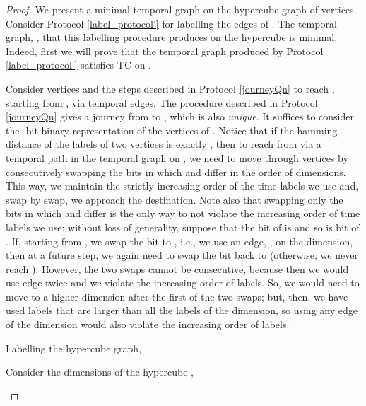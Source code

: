 \documentclass[a4paper,UKenglish]{article}
\begin{document}
\begin{proof}
We present a minimal temporal graph on the hypercube graph of  vertices. Consider Protocol \ref{label_protocol'} for labelling the edges of . The temporal graph, , that this labelling procedure produces on the hypercube is minimal. Indeed, first we will prove that the temporal graph produced by Protocol \ref{label_protocol'} satisfies TC on .

Consider vertices  and the steps described in Protocol \ref{journeyQn} to reach , starting from , via temporal edges. The procedure described in Protocol \ref{journeyQn} gives a journey from  to , which is also \emph{unique}. It suffices to consider the -bit binary representation of the vertices of . Notice that if the hamming distance of the labels of two vertices  is exactly , then to reach  from  via a temporal path in the temporal graph on , we need to move through vertices by consecutively swapping the bits in which  and  differ in the order of dimensions. This way, we maintain the strictly increasing order of the time labels we use and, swap by swap, we approach the destination. Note also that swapping only the bits in which  and  differ is the only way to not violate the increasing order of time labels we use: without loss of generality, suppose that the  bit of  is  and so is  bit of . If, starting from , we swap the  bit to , i.e., we use an edge, , on the  dimension, then at a future step, we again need to swap the  bit back to  (otherwise, we never reach ). However, the two swaps cannot be consecutive, because then we would use edge  twice and we violate the increasing order of labels. So, we would need to move to a higher dimension after the first of the two swaps; but, then, we have used labels that are larger than all the labels of the  dimension, so using any edge of the  dimension would also violate the increasing order of labels.
\begin{algorithm}[ht]
\caption{Labelling the hypercube graph, }
\label{label_protocol'}
\SetAlgoLined

	Consider the  dimensions of the hypercube , \;
\end{algorithm}


\end{proof}
\end{document}
